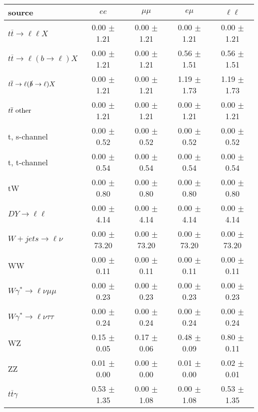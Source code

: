 \begin{tabular}{l|cccc} \hline\hline
source & $ee$ & $\mu\mu$ & $e\mu$ & $\ell\ell $ \\
\hline
$t\overline{t} \rightarrow \ell \ell X$ &  0.00 $\pm$  1.21 &  0.00 $\pm$  1.21 &  0.00 $\pm$  1.21 &  0.00 $\pm$  1.21 \\
$t\overline{t} \rightarrow \ell (b \rightarrow \ell) X$ &  0.00 $\pm$  1.21 &  0.00 $\pm$  1.21 &  0.56 $\pm$  1.51 &  0.56 $\pm$  1.51 \\
$t\overline{t} \rightarrow \ell (\slashed b \rightarrow \ell) X$ &  0.00 $\pm$  1.21 &  0.00 $\pm$  1.21 &  1.19 $\pm$  1.73 &  1.19 $\pm$  1.73 \\
        $t\overline{t}\ \rm{other}$ &  0.00 $\pm$  1.21 &  0.00 $\pm$  1.21 &  0.00 $\pm$  1.21 &  0.00 $\pm$  1.21 \\
\hline
                       t, s-channel &  0.00 $\pm$  0.52 &  0.00 $\pm$  0.52 &  0.00 $\pm$  0.52 &  0.00 $\pm$  0.52 \\
                       t, t-channel &  0.00 $\pm$  0.54 &  0.00 $\pm$  0.54 &  0.00 $\pm$  0.54 &  0.00 $\pm$  0.54 \\
                                 tW &  0.00 $\pm$  0.80 &  0.00 $\pm$  0.80 &  0.00 $\pm$  0.80 &  0.00 $\pm$  0.80 \\
\hline
         $DY \rightarrow \ell \ell$ &  0.00 $\pm$  4.14 &  0.00 $\pm$  4.14 &  0.00 $\pm$  4.14 &  0.00 $\pm$  4.14 \\
      $W+jets \rightarrow \ell \nu$ &  0.00 $\pm$ 73.20 &  0.00 $\pm$ 73.20 &  0.00 $\pm$ 73.20 &  0.00 $\pm$ 73.20 \\
                                 WW &  0.00 $\pm$  0.11 &  0.00 $\pm$  0.11 &  0.00 $\pm$  0.11 &  0.00 $\pm$  0.11 \\
\hline
$W\gamma^{*} \rightarrow \ell \nu \mu\mu$ &  0.00 $\pm$  0.23 &  0.00 $\pm$  0.23 &  0.00 $\pm$  0.23 &  0.00 $\pm$  0.23 \\
$W\gamma^{*} \rightarrow \ell \nu \tau\tau$ &  0.00 $\pm$  0.24 &  0.00 $\pm$  0.24 &  0.00 $\pm$  0.24 &  0.00 $\pm$  0.24 \\
                                 WZ &  0.15 $\pm$  0.05 &  0.17 $\pm$  0.06 &  0.48 $\pm$  0.09 &  0.80 $\pm$  0.11 \\
                                 ZZ &  0.01 $\pm$  0.00 &  0.00 $\pm$  0.00 &  0.01 $\pm$  0.00 &  0.02 $\pm$  0.01 \\
\hline
              $t\overline{t}\gamma$ &  0.53 $\pm$  1.35 &  0.00 $\pm$  1.08 &  0.00 $\pm$  1.08 &  0.53 $\pm$  1.35 \\

\end{tabular}
